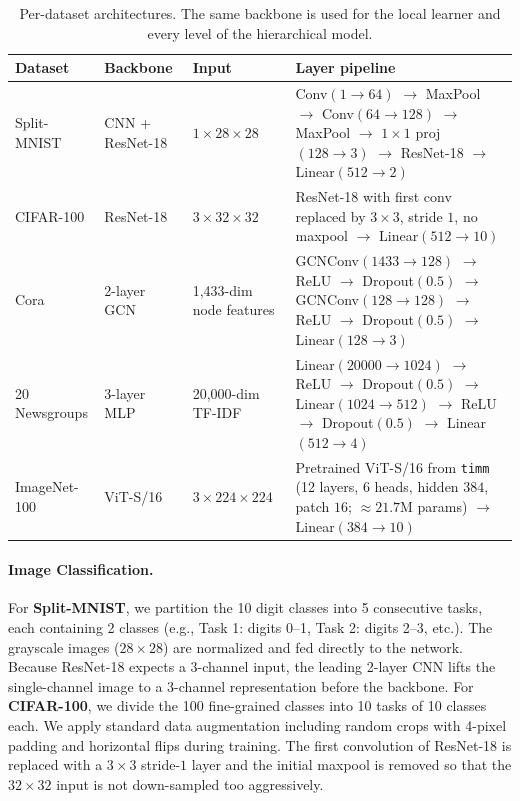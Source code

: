 \begin{table}[!htbp]
\centering
\caption{Per-dataset architectures. The same backbone is used for the local learner and every level of the hierarchical model.}
\label{tab:architectures}

\renewcommand{\arraystretch}{1.45}
\setlength{\tabcolsep}{7pt}

\begin{tabularx}{\linewidth}{@{} l l l X @{}}
\toprule
\textbf{Dataset} & \textbf{Backbone} & \textbf{Input} & \textbf{Layer pipeline} \\
\midrule
Split-MNIST   & CNN + ResNet-18 & $1{\times}28{\times}28$ &
  Conv$(1{\to}64)$ $\to$ MaxPool $\to$ Conv$(64{\to}128)$ $\to$ MaxPool
  $\to$ $1{\times}1$ proj$(128{\to}3)$ $\to$ ResNet-18 $\to$
  Linear$(512{\to}2)$ \\
CIFAR-100     & ResNet-18       & $3{\times}32{\times}32$ &
  ResNet-18 with first conv replaced by $3{\times}3$, stride $1$,
  no maxpool $\to$ Linear$(512{\to}10)$ \\
Cora          & 2-layer GCN     & 1{,}433-dim node features &
  GCNConv$(1433{\to}128)$ $\to$ ReLU $\to$ Dropout$(0.5)$ $\to$
  GCNConv$(128{\to}128)$ $\to$ ReLU $\to$ Dropout$(0.5)$ $\to$
  Linear$(128{\to}3)$ \\
20 Newsgroups & 3-layer MLP     & 20{,}000-dim TF-IDF &
  Linear$(20000{\to}1024)$ $\to$ ReLU $\to$ Dropout$(0.5)$ $\to$
  Linear$(1024{\to}512)$ $\to$ ReLU $\to$ Dropout$(0.5)$ $\to$
  Linear$(512{\to}4)$ \\
ImageNet-100  & ViT-S/16        & $3{\times}224{\times}224$ &
  Pretrained ViT-S/16 from \texttt{timm} (12 layers, 6 heads, hidden
  $384$, patch $16$; ${\approx}21.7$M params) $\to$
  Linear$(384{\to}10)$ \\
\bottomrule
\end{tabularx}
\end{table}

\paragraph{Image Classification.}
For \textbf{Split-MNIST}, we partition the 10 digit classes into 5 consecutive tasks, each containing 2 classes (e.g., Task 1: digits 0--1, Task 2: digits 2--3, etc.). The grayscale images ($28 \times 28$) are normalized and fed directly to the network. Because ResNet-18 expects a 3-channel input, the leading 2-layer CNN lifts the single-channel image to a 3-channel representation before the backbone. For \textbf{CIFAR-100}, we divide the 100 fine-grained classes into 10 tasks of 10 classes each. We apply standard data augmentation including random crops with 4-pixel padding and horizontal flips during training. The first convolution of ResNet-18 is replaced with a $3\!\times\!3$ stride-$1$ layer and the initial maxpool is removed so that the $32 \times 32$ input is not down-sampled too aggressively.

